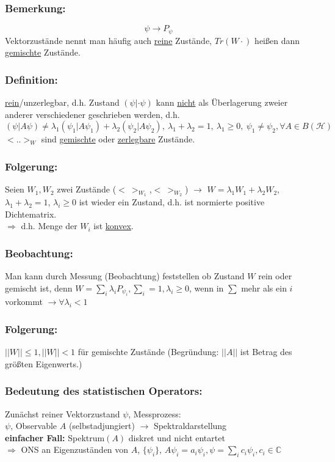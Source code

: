 \documentclass[twoside,a4paper]{scrartcl}
\newcommand{\C}{\mathbb{C}}
\renewcommand{\1}{\mathds{1}}
\newcommand{\Ra}{\Rightarrow}
\newcommand{\ra}{\rightarrow}
\renewcommand{\l}{\lambda}
\renewcommand{\H}{\mathcal{H}}
\renewcommand{\C}{\mathbb{C}}
\begin{document}
\subsubsection*{Bemerkung:}
$$\psi \ra P_\psi$$
Vektorzustände nennt man häufig auch \underline{reine} Zustände, $Tr(W \cdot)$ heißen dann \underline{gemischte} Zustände.
\subsubsection*{Definition:}
 \underline{rein}/unzerlegbar, d.h. Zustand $(\psi|\cdot \psi)$ kann \underline{nicht} als Überlagerung zweier anderer verschiedener geschrieben werden, d.h. 
$$(\psi|A\psi)\neq \l_1(\psi_1|A\psi_1)+\l_2(\psi_2|A\psi_2), \ \l_1+\l_2=1, \ \l_1 \geq 0, \ \psi_1\neq \psi_2, \forall A \in B(\H)$$
$< .. >_W$ sind \underline{gemischte} oder \underline{zerlegbare} Zustände.
\subsubsection*{Folgerung:}
Seien $W_1,W_2$ zwei Zustände ($< \ >_{W_1}$,$< \ >_{W_2}$) $\ra$ $W=\l_1 W_1+\l_2 W_2$, $\l_1+\l_2=1$, $\l_i\geq 0$ ist wieder ein Zustand, d.h. ist normierte positive Dichtematrix.\\
$\Ra$ d.h. Menge der $W_i$ ist \underline{konvex}.
\subsubsection*{Beobachtung:}
Man kann durch Messung (Beobachtung) feststellen ob Zustand $W$ rein oder gemischt ist, denn $W=\sum_i \l_i P_{\psi_i}, \sum_i=1, \l_i\geq 0$, wenn in $\sum$ mehr als ein $i$ vorkommt $\ra \forall \l_i <1$ 
\subsubsection*{Folgerung:}
$||W||\leq 1, ||W||<1$ für gemischte Zustände (Begründung: $||A||$ ist Betrag des größten Eigenwerts.)
\subsubsection*{Bedeutung des statistischen Operators:}
Zunächst reiner Vektorzustand $\psi$, Messprozess:\\
$\psi$, Observable $A$ (selbstadjungiert) $\ra$ Spektraldarstellung\\
\textbf{einfacher Fall:} Spektrum$(A)$ diskret und nicht entartet\\
$\Ra$ ONS an Eigenzuständen von $A$, $\{\psi_i\}$, $A\psi_i=a_i\psi_i, \psi=\sum_i c_i \psi_i,c_i\in \C$
\end{document}
